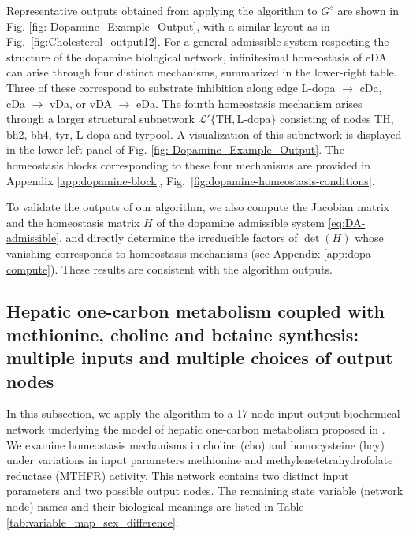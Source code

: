 \documentclass[pdflatex,sn-basic,Numbered]{sn-jnl}
\theoremstyle{thmstyleone}%
\numberwithin{equation}{section}
\begin{document}
Representative outputs obtained from applying the algorithm to $G^\diamond$ are shown in Fig. \ref{fig: Dopamine_Example_Output}, with a similar layout as in Fig.~\ref{fig:Cholesterol_output12}.
For a general admissible system respecting the structure of the dopamine biological network, infinitesimal homeostasis of eDA can arise through four distinct mechanisms, summarized in the lower-right table. Three of these correspond to substrate inhibition along edge L-dopa $\to$ cDa, cDa $\to$ vDa, or vDA $\to$ eDa. The fourth homeostasis mechanism arises through a larger structural subnetwork $\mathcal{L}'\{\text{TH},\text{L-dopa}\}$ consisting of nodes TH, bh2, bh4, tyr, L-dopa and tyrpool. A visualization of this subnetwork is displayed in the lower-left panel of Fig. \ref{fig: Dopamine_Example_Output}. The homeostasis blocks corresponding to these four mechanisms are provided in Appendix \ref{app:dopamine-block}, Fig.~\ref{fig:dopamine-homeostasis-conditions}.

To validate the outputs of our algorithm, we also compute the Jacobian matrix and the homeostasis matrix $H$ of the dopamine admissible system \eqref{eq:DA-admissible}, and directly determine the irreducible factors of $\det(H)$ whose vanishing corresponds to homeostasis mechanisms (see Appendix \ref{app:dopa-compute}). These results are consistent with the algorithm outputs.  





\subsection{Hepatic one-carbon metabolism coupled with methionine, choline and betaine synthesis: multiple inputs and multiple choices of output nodes}
\label{sec:sexdiff}

In this subsection, we apply the algorithm to a 17-node input-output biochemical network underlying the model of hepatic one-carbon metabolism proposed in \cite{sadre2018sex}. 
We examine homeostasis mechanisms in choline (cho) and homocysteine (hcy) under variations in input parameters methionine and methylenetetrahydrofolate reductase (MTHFR) activity. 
This network contains two distinct input parameters and two possible output nodes. 
The remaining state variable (network node) names and their biological meanings are listed in Table \ref{tab:variable_map_sex_difference}. 
\end{document}
